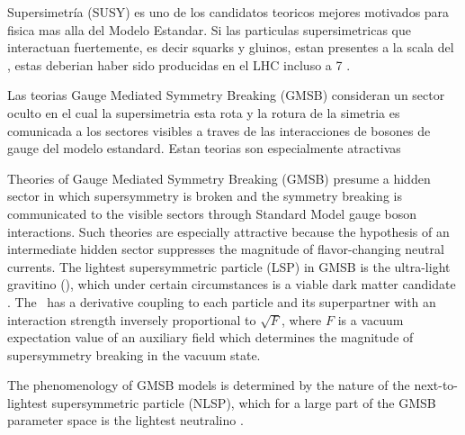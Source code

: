 Supersimetría (SUSY) \cite{Miyazawa:1966,Ramond:1971gb,Golfand:1971iw,Neveu:1971rx,Neveu:1971iv,%
  Gervais:1971ji,Volkov:1973ix,Wess:1973kz,Wess:1974tw}
es uno de los candidatos teoricos mejores motivados para fisica mas alla del Modelo Estandar.
Si las particulas supersimetricas que interactuan fuertemente, es decir squarks y gluinos, estan
presentes a la scala del \tev, estas deberian haber sido producidas en el LHC incluso a 7 \tev.

Las teorias Gauge Mediated Symmetry Breaking (GMSB) \cite{Dine:1981gu,AlvarezGaume:1981wy,%
  Nappi:1982hm,Dine:1993yw, Dine:1994vc,Dine:1995ag}
consideran un sector oculto en el cual la supersimetria esta rota y la rotura de la simetria
es comunicada a los sectores visibles a traves de las interacciones de bosones de gauge del
modelo estandard.
Estan teorias son especialmente atractivas

Theories of Gauge Mediated Symmetry Breaking (GMSB)  presume a hidden sector in which supersymmetry is
broken and the symmetry breaking is communicated to the visible sectors through Standard Model gauge boson
interactions. Such theories are especially attractive because the hypothesis of an intermediate hidden sector
suppresses the magnitude of flavor-changing neutral currents. The lightest supersymmetric particle (LSP) in GMSB
is the ultra-light gravitino (\gravino), which under certain circumstances is a viable dark matter candidate \cite{Goldberg:1983nd,Ellis:1983ew}.
The \gravino\ has a derivative coupling to each particle and its superpartner with an interaction strength inversely
proportional to $\sqrt{F}$, where $F$  is a vacuum expectation value of an auxiliary field which determines the
magnitude of supersymmetry breaking in the vacuum state.

The phenomenology of GMSB models is determined by the nature of the next-to-lightest supersymmetric particle (NLSP), which for a
large part of the GMSB parameter space is the lightest neutralino \ninoone.

